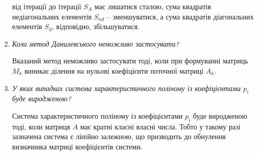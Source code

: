 \documentclass[a4paper,14pt]{extarticle} %
\begin{document}
\begin{enumerate}
    від ітерації до ітерації $S_A$ має лишатися сталою, сума квадратів недіагональних елементів $S_{nd}$ -- 
    зменшуватися, а сума квадратів діагональних елементів $S_{d}$, відповідно, збільшуватися.
    
    \item \textit{Коли метод Данилевського неможливо застосувати?}

    Вказаний метод неможливо застосувати тоді, коли при формуванні матриць $M_k$ виникає ділення на нульові 
    коефіцієнти поточної матриці $A_k$. 
    
    \item \textit{У яких випадках система характеристичного поліному із коефіцієнтами $p_{i}$ буде виродженою?}
    
    Система характеристичного поліному із коефіцієнтами $p_{i}$ буде виродженою тоді, коли матриця $A$ має 
    кратні класні власні числа. Тобто у такому разі зазначена система є лінійно залежною, що призводить до обнулення 
    визначника матриці коефіцієнтів системи.
\end{enumerate}
\end{document}
